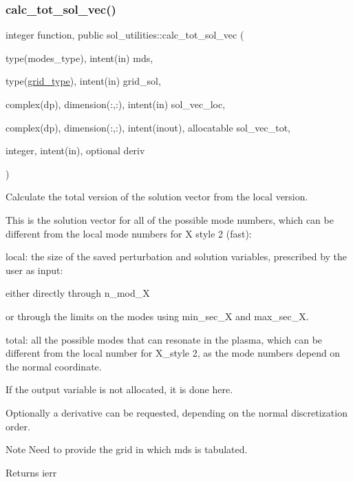 \subsubsection{\texorpdfstring{calc\+\_\+tot\+\_\+sol\+\_\+vec()}{calc\_tot\_sol\_vec()}}
{\footnotesize\ttfamily integer function, public sol\+\_\+utilities\+::calc\+\_\+tot\+\_\+sol\+\_\+vec (\begin{DoxyParamCaption}\item[{type(modes\+\_\+type), intent(in)}]{mds,  }\item[{type(\hyperlink{structgrid__vars_1_1grid__type}{grid\+\_\+type}), intent(in)}]{grid\+\_\+sol,  }\item[{complex(dp), dimension(\+:,\+:), intent(in)}]{sol\+\_\+vec\+\_\+loc,  }\item[{complex(dp), dimension(\+:,\+:), intent(inout), allocatable}]{sol\+\_\+vec\+\_\+tot,  }\item[{integer, intent(in), optional}]{deriv }\end{DoxyParamCaption})}



Calculate the total version of the solution vector from the local version. 

This is the solution vector for all of the possible mode numbers, which can be different from the local mode numbers for X style 2 (fast)\+:
\begin{DoxyItemize}
\item local\+: the size of the saved perturbation and solution variables, prescribed by the user as input\+:
\begin{DoxyItemize}
\item either directly through {\ttfamily n\+\_\+mod\+\_\+X} 
\item or through the limits on the modes using {\ttfamily min\+\_\+sec\+\_\+X} and {\ttfamily max\+\_\+sec\+\_\+X}.
\end{DoxyItemize}
\item total\+: all the possible modes that can resonate in the plasma, which can be different from the local number for {\ttfamily X\+\_\+style} 2, as the mode numbers depend on the normal coordinate.
\end{DoxyItemize}

If the output variable is not allocated, it is done here.

Optionally a derivative can be requested, depending on the normal discretization order.

\begin{DoxyNote}{Note}
Need to provide the grid in which mds is tabulated.
\end{DoxyNote}
\begin{DoxyReturn}{Returns}
ierr
\end{DoxyReturn}

